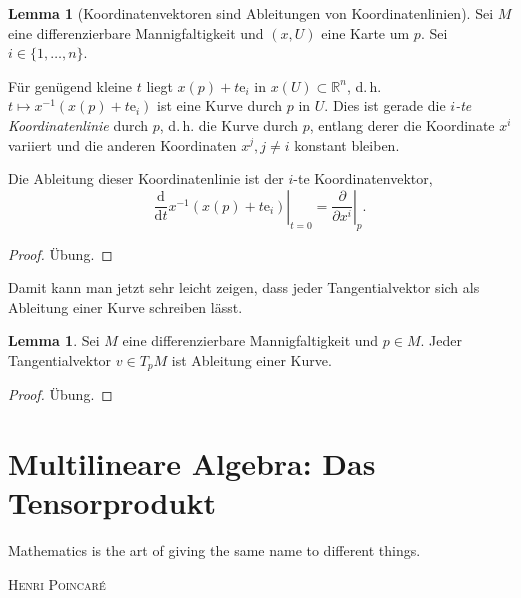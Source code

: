 \documentclass[a4paper]{scrreprt}
\numberwithin{equation}{chapter}
\newcommand{\D}{\mathrm{d}}
\newcommand{\e}{\mathrm{e}}
\newcommand{\R}{\mathbb{R}}
\theoremstyle{definition}
\newtheorem{lemma}[defn]{Lemma}
\newcommand{\bewUeb}{\begin{proof}Übung.\end{proof}}
\begin{document}
\begin{lemma}[Koordinatenvektoren sind Ableitungen von Koordinatenlinien]
	Sei $M$ eine differenzierbare Mannigfaltigkeit und $(x,U)$ eine Karte um $p$. Sei $i \in \{1,\dots,n\}$.

	Für genügend kleine $t$ liegt $x(p) + t \e_i$ in $x(U) \subset \R^n$, d.\,h. $t \mapsto x^{-1}(x(p) + t\e_i)$ ist eine Kurve durch $p$ in $U$. Dies ist gerade die \emph{$i$-te Koordinatenlinie} durch $p$, d.\,h. die Kurve durch $p$, entlang derer die Koordinate $x^i$ variiert und die anderen Koordinaten $x^j, j\ne i$ konstant bleiben.

	Die Ableitung dieser Koordinatenlinie ist der $i$-te Koordinatenvektor,
	\[\left.\frac{\D}{\D t} x^{-1}(x(p) + t\e_i) \right|_{t=0} = \left.\frac{\partial}{\partial x^i}\right|_p.\]

	\bewUeb
\end{lemma}
Damit kann man jetzt sehr leicht zeigen, dass jeder Tangentialvektor sich als Ableitung einer Kurve schreiben lässt.
\begin{lemma}
	Sei $M$ eine differenzierbare Mannigfaltigkeit und $p\in M$. Jeder Tangentialvektor $v\in T_pM$ ist Ableitung einer Kurve.

	\bewUeb
\end{lemma}


\chapter{Multilineare Algebra: Das Tensorprodukt}
\epigraph{Mathematics is the art of giving the same name to different things.}
{\textsc{Henri Poincaré}}

\end{document}

